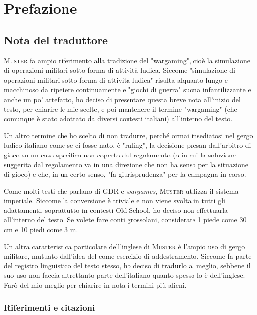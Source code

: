 \chapter{Prefazione}

\section{Nota del traduttore}

\textsc{Muster} fa ampio riferimento alla tradizione del "wargaming", cioè la simulazione di operazioni militari sotto forma di attività ludica. Siccome "simulazione di operazioni militari sotto forma di attività ludica" risulta alquanto lungo e macchinoso da ripetere continuamente e "giochi di guerra" suona infantilizzante e anche un po' artefatto, ho deciso di presentare questa breve nota all'inizio del testo, per chiarire le mie scelte, e poi mantenere il termine "wargaming" (che comunque è stato adottato da diversi contesti italiani) all'interno del testo.

Un altro termine che ho scelto di non tradurre, perché ormai insediatosi nel gergo ludico italiano come se ci fosse nato, è "ruling", la decisione presan dall'arbitro di gioco su un caso specifico non coperto dal regolamento (o in cui la soluzione suggerita dal regolamento va in una direzione che non ha senso per la situazione di gioco) e che, in un certo senso, "fa giurisprudenza" per la campagna in corso.

Come molti testi che parlano di GDR e \textit{wargames}, \textsc{Muster} utilizza il sistema imperiale. Siccome la conversione è triviale e non viene svolta in tutti gli adattamenti, soprattutto in contesti Old School, ho deciso non effettuarla all'interno del testo. Se volete fare conti grossolani, considerate 1 piede come 30 cm e 10 piedi come 3 m.

Un altra caratteristica particolare dell'inglese di \textsc{Muster} è l'ampio uso di gergo militare, mutuato dall'idea del  come esercizio di addestramento. Siccome fa parte del registro linguistico del testo stesso, ho deciso di tradurlo al meglio, sebbene il suo uso non faccia altrettanto parte dell'italiano quanto spesso lo è dell'inglese. Farò del mio meglio per chiarire in nota i termini più alieni.

\subsection{Riferimenti e citazioni}

